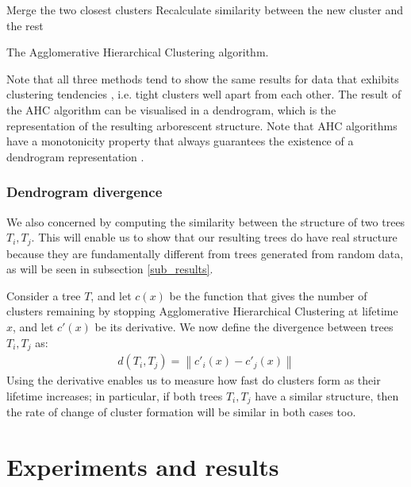 \documentclass[pdftex,11pt,a4paper]{article}
\theoremstyle{definition}
\theoremstyle{remark}
\newcommand{\norm}[1]{\left\lVert#1\right\rVert}
\begin{document}
\begin{algorithm}
\begin{algorithmic}[1]
\Repeat
\State Merge the two closest clusters
\State Recalculate similarity between the new cluster and the rest
\EndFunction
\caption{The Agglomerative Hierarchical Clustering algorithm.}\label{alg_ahc}
\end{algorithmic}
\end{algorithm}
\par Note that all three methods tend to show the same results for data that exhibits clustering tendencies \cite{hastie2008}, i.e. tight clusters well apart from each other. The result of the AHC algorithm can be visualised in a dendrogram, which is the representation of the resulting arborescent structure. Note that AHC algorithms have a monotonicity property that always guarantees the existence of a dendrogram representation \cite{hastie2008}.

\subsubsection{Dendrogram divergence}
\label{subsub_divergence}
We also concerned by computing the similarity between the structure of two trees $T_i, T_j$. This will enable us to show that our resulting trees do have real structure because they are fundamentally different from trees generated from random data, as will be seen in subsection \ref{sub_results}.
\par Consider a tree $T$, and let $c(x)$ be the function that gives the number of clusters remaining by stopping Agglomerative Hierarchical Clustering at lifetime $x$, and let $c'(x)$ be its derivative. We now define the divergence between trees $T_i, T_j$ as:
\begin{align*}
d(T_i, T_j) = \norm{c'_i(x) - c'_j(x)}
\end{align*}
Using the derivative enables us to measure how fast do clusters form as their lifetime increases; in particular, if both trees $T_i, T_j$ have a similar structure, then the rate of change of cluster formation will be similar in both cases too.

\section{Experiments and results}
\label{section_results}
\end{document}
